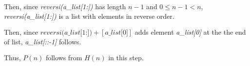 \documentclass[12pt]{article}
\begin{document}
\begin{itemize}
\begin{mdframed}
\begin{enumerate}[1.]
\begin{mdframed}
        \bigskip

        Then, since \textit{reversi(a\_list[1:])} has length $n-1$ and $0 \leq n -1 < n$,
        \textit{reversi(a\_list[1:])} is a list with elements in reverse order.

        \bigskip

        Then, since $\textit{reversi(a\_list[1:])} + [\textit{a\_list[0]}]$
        adds element \textit{a\_list[0]} at the the end of list, \textit{a\_list[::-1]} follows.

        \bigskip

        Thus, $P(n)$ follows from $H(n)$ in this step.
        \end{mdframed}
    \end{enumerate}



    \end{mdframed}
\end{itemize}
\end{document}
